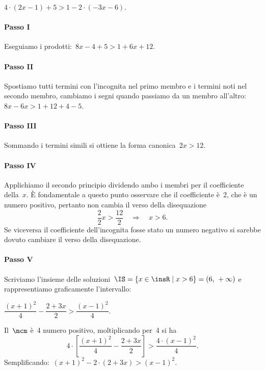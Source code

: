 \begin{exrig}
 \begin{esempio}
$4\cdot (2x-1)+5>1-2\cdot (-3x-6)$.

\paragraph{Passo I} Eseguiamo i prodotti:~$8x-4+5>1+6x+12$.

\paragraph{Passo II} Spostiamo tutti termini con
l'incognita nel primo membro e i termini noti nel
secondo membro, cambiamo i segni quando passiamo da un membro
all'altro:~$8x-6x>1+12+4-5$.

\paragraph{Passo III} Sommando i termini simili si ottiene la forma
canonica~$2x>12$.

\paragraph{Passo IV} Applichiamo il secondo principio dividendo ambo i
membri per il coefficiente della~$x$. È fondamentale a
questo punto osservare che il coefficiente è~2, che è un numero
positivo, pertanto non cambia il verso della disequazione
\[\frac{2}{2}x>\frac{12}{2}\quad\Rightarrow\quad x>6.\]
Se viceversa il
coefficiente dell'incognita fosse stato un numero
negativo si sarebbe dovuto cambiare il verso della disequazione.

\paragraph{Passo V} Scriviamo l'insieme delle
soluzioni~$\IS=\{x\in\insR\mid x>6\}=(6\text{,~}+\infty )$ e rappresentiamo
graficamente l'intervallo:
\begin{center}
 
\end{center}
 \end{esempio}

 \begin{esempio}
 $\dfrac{(x+1)^{2}}{4}-\dfrac{2+3x}{2}>\dfrac{(x-1)^{2}}{4}.$
\end{esempio}
Il~$\mcm$ è~4 numero positivo, moltiplicando per~4 si ha
\[4\cdot\left[\frac{(x+1)^{2}}{4}-\frac{2+3x}{2}\right]>\frac{4\cdot{(x-1)^{2}}}{4}.\]
Semplificando:~$(x+1)^{2}-2\cdot (2+3x)>(x-1)^{2}$.


\end{exrig}
